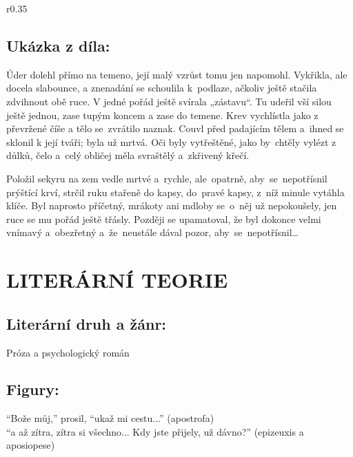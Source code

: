 \documentclass{extarticle} %
\begin{document}
\noindent\begin{wrapfigure}{r}{0.35\textwidth}
\tiny

\subsection*{Ukázka z díla:}
\setlength{\parindent}{3pt}
Úder dolehl přímo na temeno, její malý vzrůst tomu jen napomohl. Vykřikla,
ale docela slabounce, a znenadání se schoulila k~podlaze, ačkoliv ještě stačila zdvihnout obě ruce. V jedné
pořád ještě svírala „zástavu“. Tu udeřil vší silou ještě jednou, zase tupým koncem a zase do temene. Krev
vychlístla jako z převržené číše a tělo se~zvrátilo naznak. Couvl před padajícím tělem a~ihned se sklonil k její
tváři; byla už mrtvá. Oči byly vytřeštěné, jako by~chtěly vylézt z důlků, čelo a~celý obličej měla svraštělý a~zkřivený křečí.

Položil sekyru na zem vedle mrtvé a~rychle, ale~opatrně, aby~se~nepotřísnil prýštící krví, strčil ruku
stařeně do kapsy, do~pravé kapsy, z~níž minule vytáhla klíče. Byl naprosto příčetný, mrákoty ani mdloby se~o~něj už nepokoušely, jen ruce se mu pořád ještě třásly. Později se upamatoval, že byl dokonce velmi vnímavý
a~obezřetný a~že~neustále dával pozor, aby~se~nepotřísnil…
\end{wrapfigure}

\section*{LITERÁRNÍ TEORIE}

\subsection*{Literární druh a žánr:}
\noindent Próza a psychologický román



\subsection*{Figury:}
\noindent 
\enquote{Bože můj,} prosil, \enquote{ukaž mi cestu...} (apostrofa) \\
\enquote{a až zítra, zítra si všechno... Kdy jste přijely, už dávno?} (epizeuxis a aposiopese)
\end{document}
